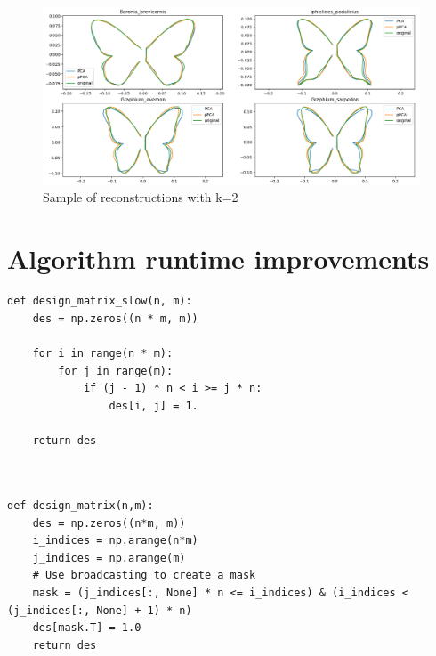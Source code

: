\documentclass[12pt]{article}
\theoremstyle{definition}
\begin{document}
\begin{figure}[h]
    \begin{center}
        \includegraphics[scale=0.5]{recons-cropped.png}
        \caption{Sample of reconstructions with k=2}
    \end{center}
\end{figure}



\section{Algorithm runtime improvements}


\begin{lstlisting}
def design_matrix_slow(n, m):
    des = np.zeros((n * m, m))
    
    for i in range(n * m):
        for j in range(m):
            if (j - 1) * n < i >= j * n:
                des[i, j] = 1.
    
    return des
 


\end{lstlisting}


\begin{lstlisting}
def design_matrix(n,m):
    des = np.zeros((n*m, m))
    i_indices = np.arange(n*m)
    j_indices = np.arange(m)
    # Use broadcasting to create a mask
    mask = (j_indices[:, None] * n <= i_indices) & (i_indices < (j_indices[:, None] + 1) * n)
    des[mask.T] = 1.0
    return des

\end{lstlisting}

\printbibliography
\end{document}
